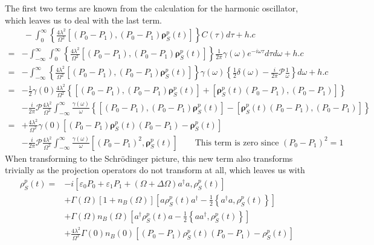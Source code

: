 	The first two terms are known from the calculation for the harmonic oscillator, which leaves us to deal with the last term.
	\begin{align*}
		&~- \int_{0}^{\infty} \left\{\frac{4\lambda^2}{\Omega^2} \left[(P_0 - P_1), (P_0 - P_1) \boldsymbol{\rho}_S^p(t) \right]\right\} C(\tau) d\tau + h.c	 \\
		=&- \int_{-\infty}^{\infty}\int_{0}^{\infty} \left\{\frac{4\lambda^2}{\Omega^2} \left[(P_0 - P_1), (P_0 - P_1) \boldsymbol{\rho}_S^p(t) \right]\right\}  \frac{1}{2\pi} \gamma(\omega) e^{-i\omega \tau }d\tau d\omega + h.c \\
		=&-\int_{-\infty}^{\infty} \left\{\frac{4\lambda^2}{\Omega^2} \left[(P_0 - P_1), (P_0 - P_1) \boldsymbol{\rho}_S^p(t) \right]\right\}   \gamma(\omega) \left\{\frac{1}{2} \delta(\omega) - \frac{i}{2 \pi} \mathcal{P} \frac{1}{\omega}\right\} d\omega + h.c \\
		=&- \frac{1}{2} \gamma(0) \frac{4\lambda^2}{\Omega^2} \left\{\left[(P_0 - P_1), (P_0 - P_1) \boldsymbol{\rho}_S^p(t) \right] + \left[  \boldsymbol{\rho}_S^p(t) (P_0 - P_1), (P_0 - P_1) \right] \right\} \\
		~&-\frac{i}{2 \pi} \mathcal{P} \frac{4\lambda^2}{\Omega^2} \int_{-\infty}^{\infty} \frac{\gamma(\omega)}{\omega}  \left\{\left[(P_0 - P_1), (P_0 - P_1) \boldsymbol{\rho}_S^p(t) \right] - \left[  \boldsymbol{\rho}_S^p(t) (P_0 - P_1), (P_0 - P_1) \right] \right\} \\
		=&+\frac{4 \lambda^2}{\Omega^2} \gamma(0) \left[(P_0 - P_1) \boldsymbol{\rho}_S^p(t) (P_0 - P_1) - \boldsymbol{\rho}_S^p(t)\right] \\
		~&-\frac{i}{2 \pi} \mathcal{P} \frac{4\lambda^2}{\Omega^2} \int_{-\infty}^{\infty} \frac{\gamma(\omega)}{\omega} \left[(P_0 - P_1)^2, \boldsymbol{\rho}_S^p(t)\right] \qquad \text{This term is zero since } (P_0 - P_1)^2 =	1
	\end{align*}
	When transforming to the Schrödinger picture, this new term also transforms trivially as the projection operators do not transform at all, which leaves us with
	\begin{align}
		{\rho}_S^p(t) =	&-i \left[\varepsilon_0 P_0 + \varepsilon_1 P_1 + (\Omega + \Delta \Omega) a^\dagger a , {\rho}_S^p(t)\right] \\
		&+ \Gamma(\Omega) \left[1 + n_B(\Omega)\right] \left[a {\rho}_S^p(t) a^\dagger - \frac{1}{2} \left\{a^\dagger a, {\rho}_S^p(t)\right\}\right] \\
		&+\Gamma(\Omega) n_B(\Omega) \left[a^\dagger {\rho}_S^p(t) a- \frac{1}{2} \left\{aa^\dagger , {\rho}_S^p(t)\right\}\right] \\
		&+ \frac{4 \lambda^2}{\Omega^2} \Gamma(0)n_B(0) \left[(P_0 - P_1) {\rho}_S^p(t) (P_0 - P_1) - {\rho}_S^p(t)\right]
	\end{align}
